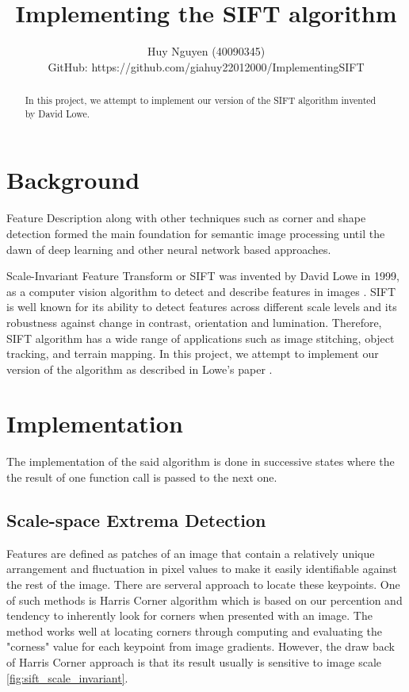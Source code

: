 \documentclass{article}
\title{Implementing the SIFT algorithm}
\author{Huy Nguyen (40090345)\\
GitHub: https://github.com/giahuy22012000/ImplementingSIFT
}
\begin{document}
\maketitle

\begin{multicols}{2}
	
	\begin{abstract}
		In this project, we attempt to implement our version of the SIFT algorithm invented by David Lowe.
	\end{abstract}
	
	\section{Background}
	Feature Description along with other techniques such as corner and shape detection formed the main foundation for semantic image processing until the dawn of deep learning and other neural network based approaches.
	
	Scale-Invariant Feature Transform or SIFT was invented by David Lowe in 1999, as a computer vision algorithm to detect and describe features in images \cite{wiki}. SIFT is well known for its ability to detect features across different scale levels and its robustness against change in contrast, orientation and lumination. Therefore, SIFT algorithm has a wide range of applications such as image stitching, object tracking, and terrain mapping.
	In this project, we attempt to implement our version of the algorithm as described in Lowe's paper \cite{Lowe:2004:DIF:993451.996342}.
	
	
	\section{Implementation}
	The implementation of the said algorithm is done in successive states where the the result of one function call is passed to the next one.
	
	\subsection{Scale-space Extrema Detection}
	Features are defined as patches of an image that contain a relatively unique arrangement and fluctuation in pixel values to make it easily identifiable against the rest of the image. There are serveral approach to locate these keypoints. One of such methods is Harris Corner algorithm which is based on our percention and tendency to inherently look for corners when presented with an image. The method works well at locating corners through computing and evaluating the "corness" value for each keypoint from image gradients. However, the draw back of Harris Corner approach is that its result usually is sensitive to image scale \ref{fig:sift_scale_invariant}. 
	

\end{multicols}
\end{document}
